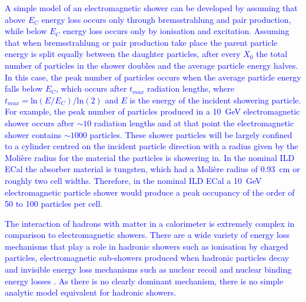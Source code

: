 \textcolor{blue}{A simple model of an electromagnetic shower can be developed by assuming that above $E_{C}$ energy loss occurs only through bremsstrahlung and pair production, while below $E_{C}$ energy loss occurs only by ionisation and excitation.  Assuming that when bremsstrahlung or pair production take place the parent particle energy is split equally between the daughter particles, after every $X_{0}$ the total number of particles in the shower doubles and the average particle energy halves.  In this case, the peak number of particles occurs when the average particle energy falls below $E_{C}$, which occurs after $t_{max}$ radiation lengths, where $t_{max} = \text{ln}(E/{E_{C}})/\text{ln}(2)$ and $E$ is the energy of the incident showering particle.  For example, the peak number of particles produced in a 10~GeV electromagnetic shower occurs after $\sim10$ radiation lengths and at that point the electromagnetic shower contains $\sim1000$ particles.  These shower particles will be largely confined to a cylinder centred on the incident particle direction with a radius given by the Moli\`{e}re radius for the material the particles is showering in.  In the nominal ILD ECal the absorber material is tungsten, which had a Moli\`{e}re radius of 0.93~cm or roughly two cell widths.  Therefore, in the nominal ILD ECal a 10~GeV electromagnetic particle shower would produce a peak occupancy of the order of 50 to 100 particles per cell.}

\textcolor{blue}{The interaction of hadrons with matter in a calorimeter is extremely complex in comparison to electromagnetic showers.  There are a wide variety of energy loss mechanisms that play a role in hadronic showers such as ionisation by charged particles, electromagnetic sub-showers produced when hadronic particles decay and invisible energy loss mechanisms such as nuclear recoil and nuclear binding energy losses \cite{Wigmans:2000vf}.  As there is no clearly dominant mechanism, there is no simple analytic model equivalent for hadronic showers.}


